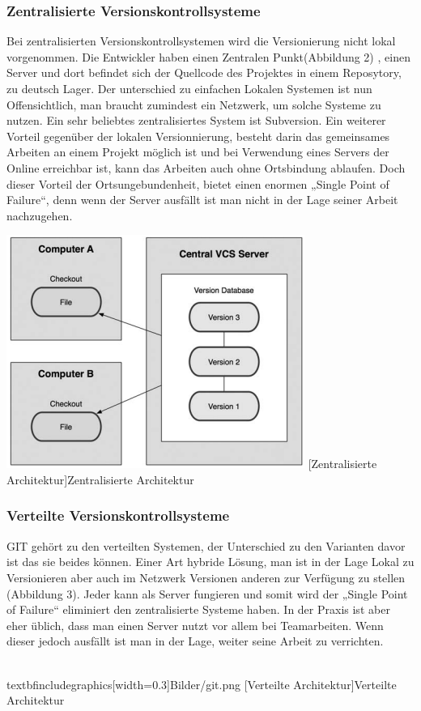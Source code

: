 \documentclass[12pt,a4paper,bibliography=totocnumbered,listof=totocnumbered]{scrartcl}
\begin{document}
\subsubsection{Zentralisierte Versionskontrollsysteme}
Bei zentralisierten Versionskontrollsystemen wird die Versionierung nicht lokal vorgenommen. Die Entwickler haben einen Zentralen Punkt(Abbildung 2) , einen Server und dort befindet sich der Quellcode des Projektes in einem Reposytory, zu deutsch Lager. Der unterschied zu einfachen Lokalen Systemen ist nun Offensichtlich, man braucht zumindest ein Netzwerk, um solche Systeme zu nutzen. Ein sehr beliebtes zentralisiertes System ist Subversion. Ein weiterer Vorteil gegenüber der lokalen Versionnierung, besteht darin das gemeinsames Arbeiten an einem Projekt möglich ist und bei Verwendung eines Servers der Online erreichbar ist, kann das Arbeiten auch ohne Ortsbindung ablaufen. Doch dieser Vorteil der Ortsungebundenheit, bietet einen enormen „Single Point of Failure“, denn wenn der Server ausfällt ist man nicht in der Lage seiner Arbeit nachzugehen.

\newline
\vspace{3pt}
\begin{minipage}{\linewidth}
	\centering
	\includegraphics[width=0.3\linewidth]{Bilder/sub.png}
	[Zentralisierte Architektur]{Zentralisierte Architektur\footnotemark }
	\label{fig:osgi}
\end{minipage} 	

\subsubsection{Verteilte Versionskontrollsysteme}
GIT gehört zu den verteilten Systemen, der Unterschied zu den Varianten davor ist das sie beides können. 
Einer Art hybride Lösung, man ist in der Lage Lokal zu Versionieren aber auch im Netzwerk Versionen anderen zur Verfügung zu stellen (Abbildung 3). Jeder kann als Server fungieren und somit  wird der „Single Point of Failure“ eliminiert den zentralisierte Systeme haben. In der Praxis ist aber eher üblich, dass man einen Server nutzt vor allem bei Teamarbeiten. Wenn dieser jedoch ausfällt ist man in der Lage, weiter seine Arbeit zu verrichten.
\newline
\vspace{3pt}
\begin{minipage}{\linewidth}
	\centering
	\\textbf{includegraphics[width=0.3\linewidth]{Bilder/git.png}}
	[Verteilte Architektur]{Verteilte Architektur\footnotemark }
	\label{fig:osgi}
\end{minipage}
   
\end{document}
